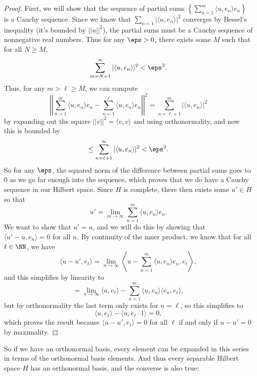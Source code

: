 \begin{proof}
First, we will show that the sequence of partial sums $\left\{\sum_{n=1}^m \langle u, e_n \rangle e_n\right\}$ is a Cauchy sequence. Since we know that $\sum_{n=1} |\langle u, e_n \rangle|^2$ converges by Bessel's inequality (it's bounded by $||u||^2$), the partial sums must be a Cauchy sequence of nonnegative real numbers. Thus for any $\eps > 0$, there exists some $M$ such that for all $N \ge M$, 
\[
    \sum_{m = N+1}^{\infty} |\langle u, e_n \rangle|^2 < \eps^2.
\]
Thus, for any $m > \ell \ge M$, we can compute 
\[
    \left|\left|\sum_{n=1}^m \langle u, e_n \rangle e_n - \sum_{n=1}^{\ell} \langle u, e_n \rangle e_n \right|\right|^2 = \sum_{n=\ell+1}^m |\langle u, e_n \rangle|^2
\]
by expanding out the square $||v||^2 = \langle v, v \rangle$ and using orthonormality, and now this is bounded by 
\[
    \le \sum_{n=\ell+1}^\infty |\langle u, e_n \rangle|^2 < \eps^2.
\]
So for any $\eps$, the squared norm of the difference between partial sums goes to $0$ as we go far enough into the sequence, which proves that we do have a Cauchy sequence in our Hilbert space. Since $H$ is complete, there then exists some $u' \in H$ so that
\[
    u' = \lim_{m \to \infty} \sum_{n=1}^m \langle u, e_n \rangle e_n.
\]
We want to show that $u' = u$, and we will do this by showing that $\langle u' - u, e_n \rangle = 0$ for all $n$. By continuity of the inner product, we know that for all $\ell \in \NN$, we have
\[
    \langle u - u', e_\ell \rangle = \lim_{n \to \infty} \left\langle u - \sum_{n=1}^m \langle u, e_n \rangle e_n, e_\ell \right\rangle,
\]
and this simplifies by linearity to 
\[
    = \lim_{n \to \infty} \langle u, e_\ell \rangle - \sum_{n=1}^m \langle u, e_n \rangle \langle e_n, e_\ell \rangle,
\]
but by orthonormality the last term only exists for $n = \ell$, so this simplifies to 
\[
    \langle u, e_\ell \rangle - \langle u, e_\ell \cdot 1 \rangle = 0,
\]  
which proves the result because $\langle u - u', e_\ell \rangle = 0$ for all $\ell$ if and only if $u - u' = 0$ by maximality. 
\end{proof}

So if we have an orthonormal basis, every element can be expanded in this series in terms of the orthonormal basis elements. And thus every separable Hilbert space $H$ has an orthonormal basis, and the converse is also true:

